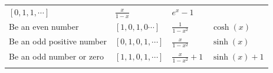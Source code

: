 \begin{longtable}[]{@{}llll@{}}
\begin{minipage}[t]{0.22\columnwidth}
\([0,1,1,\cdots]\)\strut
\end{minipage} & \begin{minipage}[t]{0.22\columnwidth}\raggedright
\(\frac x {1-x}\)\strut
\end{minipage} & \begin{minipage}[t]{0.22\columnwidth}\raggedright
\(e^x - 1\)\strut
\end{minipage}\tabularnewline
\begin{minipage}[t]{0.22\columnwidth}\raggedright
Be an even number\strut
\end{minipage} & \begin{minipage}[t]{0.22\columnwidth}\raggedright
\([1,0,1,0\cdots]\)\strut
\end{minipage} & \begin{minipage}[t]{0.22\columnwidth}\raggedright
\(\frac 1 {1-x^2}\)\strut
\end{minipage} & \begin{minipage}[t]{0.22\columnwidth}\raggedright
\(\cosh(x)\)\strut
\end{minipage}\tabularnewline
\begin{minipage}[t]{0.22\columnwidth}\raggedright
Be an odd positive number\strut
\end{minipage} & \begin{minipage}[t]{0.22\columnwidth}\raggedright
\([0,1,0,1,\cdots]\)\strut
\end{minipage} & \begin{minipage}[t]{0.22\columnwidth}\raggedright
\(\frac x {1-x^2}\)\strut
\end{minipage} & \begin{minipage}[t]{0.22\columnwidth}\raggedright
\(\sinh(x)\)\strut
\end{minipage}\tabularnewline
\begin{minipage}[t]{0.22\columnwidth}\raggedright
Be an odd number or zero\strut
\end{minipage} & \begin{minipage}[t]{0.22\columnwidth}\raggedright
\([1,1,0,1,\cdots]\)\strut
\end{minipage} & \begin{minipage}[t]{0.22\columnwidth}\raggedright
\(\frac x {1-x^2} + 1\)\strut
\end{minipage} & \begin{minipage}[t]{0.22\columnwidth}\raggedright
\(\sinh(x)+1\)\strut
\end{minipage}\tabularnewline
\begin{minipage}[t]{0.22\columnwidth}\raggedright

\end{minipage}
\end{longtable}
